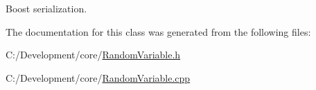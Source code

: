 Boost serialization. 



The documentation for this class was generated from the following files\-:\begin{DoxyCompactItemize}
\item 
C\-:/\-Development/core/\hyperlink{_random_variable_8h}{Random\-Variable.\-h}\item 
C\-:/\-Development/core/\hyperlink{_random_variable_8cpp}{Random\-Variable.\-cpp}\end{DoxyCompactItemize}
